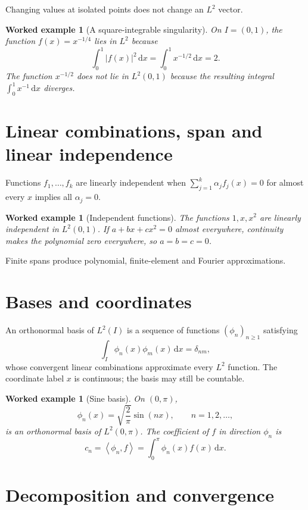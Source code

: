 \documentclass[11pt,a5paper,oneside,openany]{scrreprt}
\theoremstyle{notes}
\theoremstyle{definitions}
\newtheorem{example}[theorem]{Worked example}
\newcommand{\ip}[2]{\left\langle #1,#2\right\rangle}
\newcommand{\dd}{\,\mathrm{d}}
\begin{document}
Changing values at isolated points does not change an $L^2$ vector.

\begin{example}[A square-integrable singularity]
On $I=(0,1)$, the function $f(x)=x^{-1/4}$ lies in $L^2$ because
\[
 \int_0^1|f(x)|^2\dd x=\int_0^1x^{-1/2}\dd x=2.
\]
The function $x^{-1/2}$ does not lie in $L^2(0,1)$ because the resulting
integral $\int_0^1x^{-1}\dd x$ diverges.
\end{example}

\section{Linear combinations, span and linear independence}

Functions $f_1,\ldots,f_k$ are linearly independent when
$\sum_{j=1}^k\alpha_jf_j(x)=0$ for almost every $x$ implies all
$\alpha_j=0$.

\begin{example}[Independent functions]
The functions $1,x,x^2$ are linearly independent in $L^2(0,1)$.  If
$a+bx+cx^2=0$ almost everywhere, continuity makes the polynomial zero
everywhere, so $a=b=c=0$.
\end{example}

Finite spans produce polynomial, finite-element and Fourier approximations.

\section{Bases and coordinates}

An orthonormal basis of $L^2(I)$ is a sequence of functions
$(\phi_n)_{n\ge1}$ satisfying
\[
 \int_I\phi_n(x)\phi_m(x)\dd x=\delta_{nm},
\]
whose convergent linear combinations approximate every $L^2$ function.  The
coordinate label $x$ is continuous; the basis may still be countable.

\begin{example}[Sine basis]
On $(0,\pi)$,
\[
  \phi_n(x)=\sqrt{\frac2\pi}\sin(nx),
  \qquad n=1,2,\ldots,
\]
is an orthonormal basis of $L^2(0,\pi)$.  The coefficient of $f$ in direction
$\phi_n$ is
\[
 c_n=\ip{\phi_n}{f}=\int_0^\pi\phi_n(x)f(x)\dd x.
\]
\end{example}

\section{Decomposition and convergence}
\end{document}
